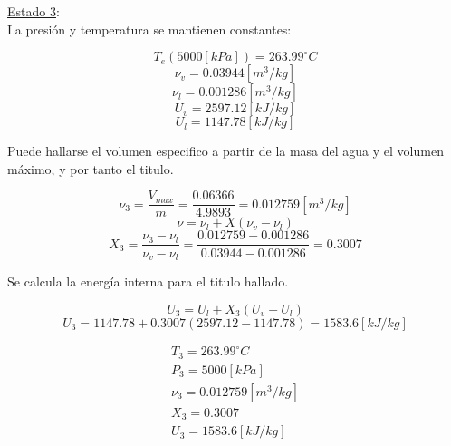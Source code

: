 \documentclass[letter,11pt]{article}
\begin{document}
\begin{enumerate}
\underline{Estado 3}:\\
La presión y temperatura se mantienen constantes:

\begin{equation*}
    T_{e}(5000[kPa])=263.99^\circ C
\end{equation*}
\begin{equation*}
    \nu_v=0.03944[m^3/kg]
\end{equation*}
\begin{equation*}
    \nu_l=0.001286[m^3/kg]
\end{equation*}
\begin{equation*}
    U_v=2597.12[kJ/kg]
\end{equation*}
\begin{equation*}
    U_l=1147.78[kJ/kg]
\end{equation*}

Puede hallarse el volumen especifico a partir de la masa del agua y el volumen 
máximo, y por tanto el titulo.

\begin{equation*}
    \nu_3=\frac{V_{max}}{m}=\frac{0.06366}{4.9893}=0.012759[m^3/kg]
\end{equation*}
\begin{equation*}
    \nu=\nu_l+X(\nu_v-\nu_l)
\end{equation*}
\begin{equation*}
    X_3=\frac{\nu_3-\nu_l}{\nu_v-\nu_l}
    =\frac{0.012759-0.001286}{0.03944-0.001286}
    =0.3007
\end{equation*}

Se calcula la energía interna para el titulo hallado.

\begin{equation*}
    U_3=U_l+X_3(U_v-U_l)
\end{equation*}
\begin{equation*}
    U_3=1147.78+0.3007(2597.12-1147.78)=1583.6[kJ/kg]
\end{equation*}

\begin{equation*}
\boxed{
    \begin{array}{l}
        T_3=263.99^\circ C \\
        P_3=5000[kPa] \\
        \nu_3=0.012759[m^3/kg] \\
        X_3=0.3007 \\
        U_3=1583.6[kJ/kg]
    \end{array}
}
\end{equation*}


\end{enumerate}
\end{document}
